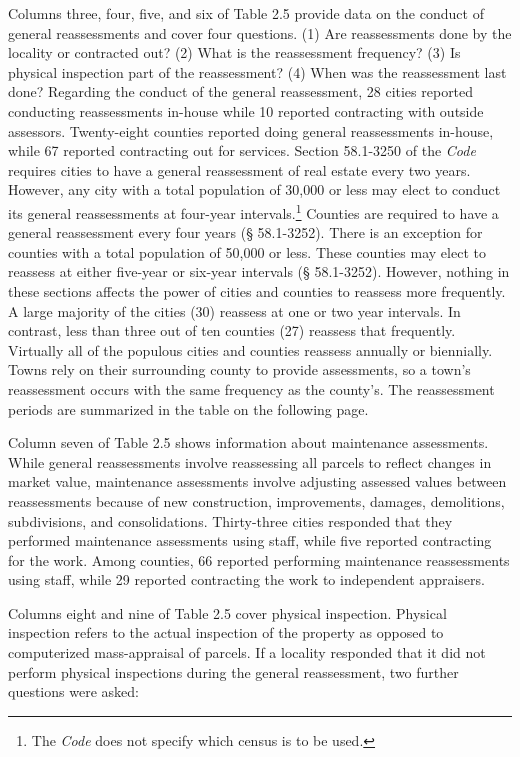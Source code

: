 \documentclass[
]{book}
\begin{document}
Columns three, four, five, and six of Table 2.5 provide data on the conduct of general reassessments and cover four questions. (1) Are reassessments done by the locality or contracted out? (2) What is the reassessment frequency? (3) Is physical inspection part of the reassessment? (4) When was the reassessment last done? Regarding the conduct of the general reassessment, 28 cities reported conducting reassessments in-house while 10 reported contracting with outside assessors. Twenty-eight counties reported doing general reassessments in-house, while 67 reported contracting out for services. Section 58.1-3250 of the \emph{Code} requires cities to have a general reassessment of real estate every two years. However, any city with a total population of 30,000 or less may elect to conduct its general reassessments at four-year intervals.\footnote{The \emph{Code} does not specify which census is to be used.} Counties are required to have a general reassessment every four years (§ 58.1-3252). There is an exception for counties with a total population of 50,000 or less. These counties may elect to reassess at either five-year or six-year intervals (§ 58.1-3252). However, nothing in these sections affects the power of cities and counties to reassess more frequently. A large majority of the cities (30) reassess at one or two year intervals. In contrast, less than three out of ten counties (27) reassess that frequently. Virtually all of the populous cities and counties reassess annually or biennially. Towns rely on their surrounding county to provide assessments, so a town's reassessment occurs with the same frequency as the county's. The reassessment periods are summarized in the table on the following page.

Column seven of Table 2.5 shows information about maintenance assessments. While general reassessments involve reassessing all parcels to reflect changes in market value, maintenance assessments involve adjusting assessed values between reassessments because of new construction, improvements, damages, demolitions, subdivisions, and consolidations. Thirty-three cities responded that they performed maintenance assessments using staff, while five reported contracting for the work. Among counties, 66 reported performing maintenance reassessments using staff, while 29 reported contracting the work to independent appraisers.

Columns eight and nine of Table 2.5 cover physical inspection. Physical inspection refers to the actual inspection of the property as opposed to computerized mass-appraisal of parcels. If a locality responded that it did not perform physical inspections during the general reassessment, two further questions were asked:
\end{document}
